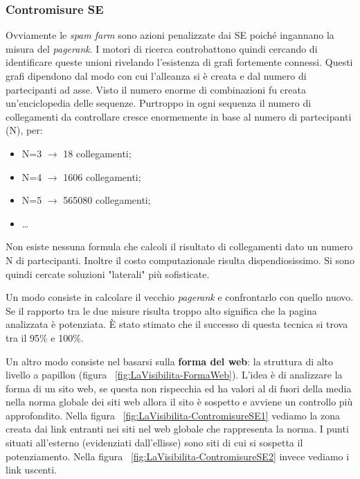 			\subsubsection{Contromisure SE}
				Ovviamente le \emph{spam farm} sono azioni penalizzate dai SE poiché ingannano la misura del \emph{pagerank}. I motori di ricerca controbattono quindi cercando di identificare queste unioni rivelando l'esistenza di grafi fortemente connessi. Questi grafi dipendono dal modo con cui l'alleanza si è creata e dal numero di partecipanti ad asse. Visto il numero enorme di combinazioni fu creata un'enciclopedia delle sequenze. Purtroppo in ogni sequenza il numero di collegamenti da controllare cresce enormemente in base al numero di partecipanti (N), per:
				\begin{itemize}
					\item N=3 $\rightarrow$ 18 collegamenti;
					\item N=4 $\rightarrow$ 1606 collegamenti;
					\item N=5 $\rightarrow$ 565080 collegamenti;
					\item \dots
				\end{itemize}
				Non esiste nessuna formula che calcoli il risultato di collegamenti dato un numero N di partecipanti. Inoltre il costo computazionale risulta dispendiosissimo. Si sono quindi cercate soluzioni "laterali" più sofisticate.
				
				Un modo consiste in calcolare il vecchio \emph{pagerank} e confrontarlo con quello nuovo. Se il rapporto tra le due misure risulta troppo alto significa che la pagina analizzata è potenziata. È stato stimato che il successo di questa tecnica si trova tra il 95\% e 100\%.				
				
				Un altro modo consiste nel basarsi sulla \textbf{forma del web}: la struttura di alto livello a papillon (figura ~\ref{fig:LaVisibilita-FormaWeb}). L'idea è di analizzare la forma di un sito web, se questa non rispecchia ed ha valori al di fuori della media nella norma globale dei siti web allora il sito è sospetto e avviene un controllo più approfondito.
				Nella figura ~\ref{fig:LaVisibilita-ContromisureSE1} vediamo la zona creata dai link entranti nei siti nel web globale che rappresenta la norma. I punti situati all'esterno (evidenziati dall'ellisse) sono siti di cui si sospetta il potenziamento. Nella figura ~\ref{fig:LaVisibilita-ContromisureSE2} invece vediamo i link uscenti. 
				
